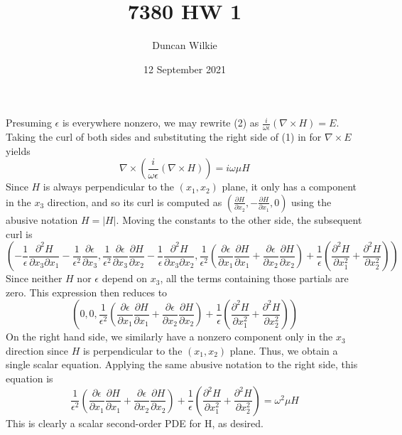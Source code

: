 \documentclass{article}
\title{7380 HW 1}
\author{Duncan Wilkie}
\date{12 September 2021}
\begin{document}
\maketitle

\section{}
Presuming $\epsilon$ is everywhere nonzero, we may rewrite (2) as $\frac{i}{\omega\epsilon}\left(\nabla\times H\right) = E$.
Taking the curl of both sides and substituting the right side of (1) in for $\nabla\times E$ yields
\[\nabla\times\left(\frac{i}{\omega\epsilon}\left(\nabla\times H\right)\right) = i\omega\mu H\]
Since $H$ is always perpendicular to the $(x_1,x_2)$ plane, it only has a component in the $x_3$ direction, and so its curl is computed as
$\left(\frac{\partial H}{\partial x_2}, -\frac{\partial H}{\partial x_1}, 0\right)$ using the abusive notation $H=|H|$.
Moving the constants to the other side, the subsequent curl is
\[\left(-\frac{1}{\epsilon}\frac{\partial^2H}{\partial x_3\partial x_1} - \frac{1}{\epsilon^2}\frac{\partial\epsilon}{\partial x_3}, \frac{1}{\epsilon^2}\frac{\partial \epsilon}{\partial x_3}\frac{\partial H}{\partial x_2}-\frac{1}{\epsilon}\frac{\partial^2 H}{\partial x_3\partial x_2}, \frac{1}{\epsilon^2}\left(\frac{\partial\epsilon}{\partial x_1}\frac{\partial H}{\partial x_1}+\frac{\partial \epsilon}{\partial x_2}\frac{\partial H}{\partial x_2}\right)+\frac{1}{\epsilon}\left(\frac{\partial^2 H}{\partial x_1^2}+\frac{\partial^2 H}{\partial x_2^2}\right)\right)\]
Since neither $H$ nor $\epsilon$ depend on $x_3$, all the terms containing those partials are zero. This expression then reduces to \[\left(0, 0, \frac{1}{\epsilon^2}\left(\frac{\partial\epsilon}{\partial x_1}\frac{\partial H}{\partial x_1}+\frac{\partial \epsilon}{\partial x_2}\frac{\partial H}{\partial x_2}\right)+\frac{1}{\epsilon}\left(\frac{\partial^2 H}{\partial x_1^2}+\frac{\partial^2 H}{\partial x_2^2}\right)\right)\]
On the right hand side, we similarly have a nonzero component only in the $x_3$ direction since $H$ is perpendicular to the $(x_1, x_2)$ plane. Thus, we obtain a single scalar equation. Applying the same abusive notation to the right side, this equation is
\[\frac{1}{\epsilon^2}\left(\frac{\partial\epsilon}{\partial x_1}\frac{\partial H}{\partial x_1}+\frac{\partial \epsilon}{\partial x_2}\frac{\partial H}{\partial x_2}\right)+\frac{1}{\epsilon}\left(\frac{\partial^2 H}{\partial x_1^2}+\frac{\partial^2 H}{\partial x_2^2}\right) = \omega^2\mu H\]
This is clearly a scalar second-order PDE for H, as desired.
\end{document}
